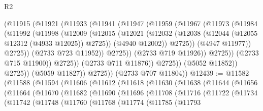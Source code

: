 \begin{lexlean}{R2}
\begin{coremodule}
                        (@11915
                          (@11921
                            (@11933
                              (@11941
                                (@11947
                                  (@11959
                                    (@11967
                                      (@11973
                                        (@11984
                                          (@11992
                                            (@11998
                                              (@12009
                                                (@12015
                                                  (@12021
                                                    (@12032
                                                      (@12038
                                                        (@12044
                                                          (@12055 @12312 (@4933 @12025))
                                                          @2725))
                                                      (@4940 @12002))
                                                    @2725))
                                                (@4947 @11977))
                                              @2725))
                                          (@2733 @723 @11952))
                                        @2725))
                                    (@2733 @719 @11926))
                                  @2725))
                              (@2733 @715 @11900))
                            @2725))
                        (@2733 @711 @11876))
                      @2725))
                  (@5052 @11852))
                @2725))
            (@5059 @11827))
          @2725))
      (@2733 @707 @11804))
@12439 := @11582
    (@11588
      (@11594
        (@11606
          (@11612
            (@11618
              (@11630
                (@11638
                  (@11644
                    (@11656
                      (@11664
                        (@11670
                          (@11682
                            (@11690
                              (@11696
                                (@11708
                                  (@11716
                                    (@11722
                                      (@11734
                                        (@11742
                                          (@11748
                                            (@11760
                                              (@11768
                                                (@11774
                                                  (@11785
                                                    (@11793

\end{coremodule}
\end{lexlean}
